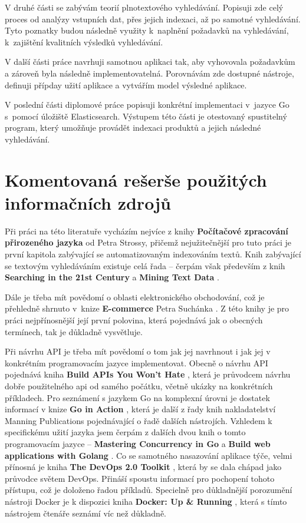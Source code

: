 \documentclass[FM,DP]{tulthesis}
\begin{document}
V druhé části se zabývám teorií plnotextového vyhledávání. Popisuji zde celý
proces od analýzy vstupních dat, přes jejich indexaci, až po samotné vyhledávání. 
Tyto poznatky budou následně využity k~naplnění požadavků na vyhledávání, k~zajištění
kvalitních výsledků vyhledávání.

V další části práce navrhuji samotnou aplikaci tak, aby vyhovovala požadavkům a zároveň byla 
následně implementovatelná. Porovnávám zde dostupné nástroje, definuji přípday užití aplikace
a vytvářím model výsledné aplikace.

V poslední části diplomové práce popisuji konkrétní implementaci v~jazyce Go s~pomocí úložiště 
Elasticsearch. Výstupem této části je otestovaný spustitelný program, který umožňuje provádět 
indexaci produktů a jejich následné vyhledávání.


\chapter{Komentovaná rešerše použitých informačních zdrojů}

Při práci na této literatuře vycházím nejvíce z knihy \textbf{Počítačové zpracování přirozeného 
jazyka} \cite{strossa} od Petra Strossy, přičemž nejužitečnější pro tuto práci je první kapitola 
zabývající se automatizovaným indexováním textů. Knih zabývající se textovým vyhledáváním existuje
celá řada -- čerpám však především z knih \textbf{Searching in the 21st Century} \cite{searching}
a \textbf{Mining Text Data} \cite{mining}.

Dále je třeba mít povědomí o oblasti elektronického obchodování, což je přehledně shrnuto v~knize
\textbf{E-commerce} Petra Suchánka \cite{e-commerce}. Z této knihy je pro práci nejpřínosnější 
její první polovina, která pojednává jak o obecných termínech, tak je důkladně vysvětluje.

Při návrhu API je třeba mít povědomí o tom jak jej navrhnout i jak jej v konkrétním programovacím 
jazyce implementovat. Obecně o návrhu API pojednává kniha \textbf{Build APIs You Won't Hate} \cite{api},
která je průvodcem návrhu dobře použitelného api od samého počátku, včetně ukázky na konkrétních příkladech.
Pro seznámení s jazykem Go na komplexní úrovni je dostatek informací v knize \textbf{Go in Action} 
\cite{go-in-action}, která je další z řady knih nakladatelství Manning Publications pojednávající
o řadě dalších nástrojích. Vzhledem k specifickému užití jazyka jsem čerpám z dalších dvou knih
o tomto programovacím jazyce -- \textbf{Mastering Concurrency in Go} \cite{go-concurrency} a 
\textbf{Build web applications with Golang} \cite{go-xml}. Co se samotného nasazování aplikace týče, 
velmi přínosná je kniha \textbf{The DevOps 2.0 Toolkit} \cite{devops}, která by se dala chápad jako průvodce 
světem DevOps. Přináší spoustu informací pro pochopení tohoto přístupu, což je doloženo řadou 
příkladů. Specielně pro důkladnější porozumění nástroji Docker je k dispozici kniha 
\textbf{Docker: Up \& Running} \cite{docker}, která s tímto nástrojem čtenáře seznámí víc než důkladně.
\end{document}
